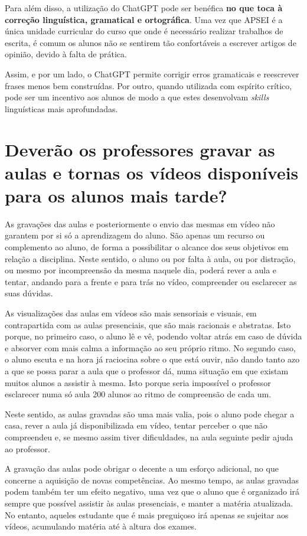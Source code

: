 \documentclass[portuguese, 11pt, a4paper, titlepage, oneside]{article}
\begin{document}
Para além disso, a utilização do ChatGPT pode ser benéfica \textbf{no que toca à correção linguística, gramatical e ortográfica}. Uma vez que APSEI é a única unidade curricular do curso que onde é necessário realizar trabalhos de escrita, é comum os alunos não se sentirem tão confortáveis a escrever artigos de opinião, devido à falta de prática.

Assim, e por um lado, o ChatGPT permite corrigir erros gramaticais e reescrever frases menos bem construídas. Por outro, quando utilizada com espírito crítico, pode ser um incentivo aos alunos de modo a que estes desenvolvam \textit{skills} linguísticas mais aprofundadas.

\section{Deverão os professores gravar as aulas e tornas os vídeos disponíveis para os alunos mais tarde?}
As gravações das aulas e posteriormente o envio das mesmas em vídeo não garantem por si só a aprendizagem do aluno. São apenas um recurso ou complemento ao aluno, de forma a possibilitar o alcance dos seus objetivos em relação a disciplina. Neste sentido, o aluno ou por falta à aula, ou por distração, ou mesmo por incompreensão da mesma naquele dia, poderá rever a aula e tentar, andando para a frente e para trás no vídeo, compreender ou esclarecer as suas dúvidas.

As visualizações das aulas em vídeos são mais sensoriais e visuais, em contrapartida com as aulas presenciais, que são mais racionais e abstratas. Isto porque, no primeiro caso, o aluno lê e vê, podendo voltar atrás em caso de dúvida e absorver com mais calma a informação ao seu próprio ritmo. No segundo caso, o aluno escuta e na hora já raciocina sobre o que está ouvir, não dando tanto azo a que se possa parar a aula que o professor dá, numa situação em que existam muitos alunos a assistir à mesma. Isto porque seria impossível o professor esclarecer numa só aula 200 alunos ao ritmo de compreensão de cada um.

Neste sentido, as aulas gravadas são uma mais valia, pois o aluno pode chegar a casa, rever a aula já disponibilizada em vídeo, tentar perceber o que não compreendeu e, se mesmo assim tiver dificuldades, na aula seguinte pedir ajuda ao professor.

A gravação das aulas pode obrigar o decente a um esforço adicional, no que concerne a aquisição de novas competências. Ao mesmo tempo, as aulas gravadas podem também ter um efeito negativo, uma vez que o aluno que é organizado irá sempre que possível assistir às aulas presenciais, e manter a matéria atualizada. No entanto, aqueles estudante que é mais preguiçoso irá apenas se sujeitar aos vídeos, acumulando matéria até à altura dos exames.
\end{document}
